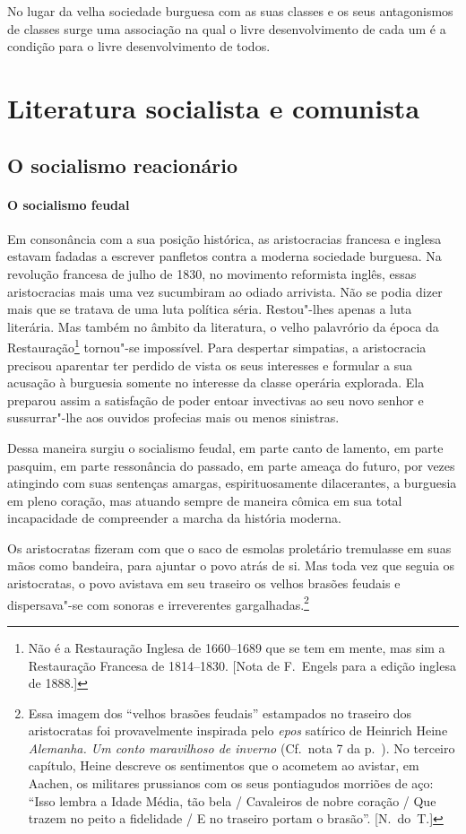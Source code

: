 No lugar da velha sociedade burguesa com as suas classes e os seus
antagonismos de classes surge uma associação na qual o livre
desenvolvimento de cada um é a condição para o livre desenvolvimento de
todos.

\section{Literatura socialista e comunista}

\subsection{O socialismo reacionário}

\paragraph{O socialismo feudal}
Em consonância com a sua posição histórica, as aristocracias
francesa e inglesa estavam fadadas a escrever panfletos contra a
moderna sociedade burguesa. Na revolução francesa de julho de 1830, no
movimento reformista inglês, essas aristocracias mais uma vez				
sucumbiram ao odiado arrivista. Não se podia dizer mais que se tratava
de uma luta política séria. Restou"-lhes apenas a luta literária. Mas
também no âmbito da literatura, o velho palavrório da época da
Restauração\footnote{ Não é a Restauração Inglesa de 1660--1689 que se tem em mente, mas sim a
Restauração Francesa de 1814--1830. [Nota de F.~Engels para a edição
inglesa de 1888.]}
tornou"-se impossível. Para despertar simpatias, a
aristocracia precisou aparentar ter perdido de vista os seus interesses
e formular a sua acusação à burguesia somente no interesse da
classe operária explorada. Ela preparou assim a satisfação de
poder entoar invectivas ao seu novo senhor e sussurrar"-lhe aos
ouvidos profecias mais ou menos sinistras.

Dessa maneira surgiu o socialismo feudal, em parte canto de lamento, em
parte pasquim, em parte ressonância do passado, em parte ameaça do
futuro, por vezes atingindo com suas sentenças amargas,
espirituosamente dilacerantes, a burguesia em pleno coração, mas
atuando sempre de maneira cômica em sua total incapacidade de
compreender a marcha da história moderna.

Os aristocratas fizeram com que o saco de esmolas proletário
tremulasse em suas mãos como bandeira, para ajuntar o povo atrás de si.
Mas toda vez que seguia os aristocratas, o povo avistava em seu
traseiro os velhos brasões feudais e dispersava"-se com sonoras e
irreverentes
gargalhadas.\footnote{ Essa imagem dos “velhos brasões feudais”
estampados no traseiro dos aristocratas foi provavelmente inspirada
pelo \textit{epos} satírico de Heinrich Heine\textit{ Alemanha. Um
conto maravilhoso de inverno} (Cf.~nota 7 da p.~\pageref{7}). No terceiro capítulo, Heine
descreve os sentimentos que o acometem ao avistar, em Aachen, os
militares prussianos com os seus pontiagudos morriões de aço: “Isso
lembra a Idade Média, tão bela / Cavaleiros de nobre coração / Que
trazem no peito a fidelidade / E no traseiro portam o brasão”. [N.~do~T.]}


